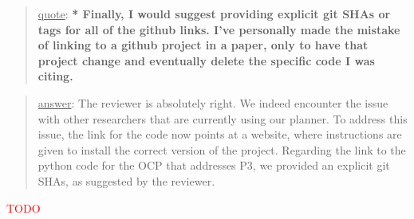 \documentclass[a4paper]{article}
\newcommand{\ndone}[0]{\textcolor{red}{TODO}}
\newcommand\quot[1]{\begin{quote} \underline{quote}: \textbf{#1}\end{quote}}
\newcommand\as[1]{\begin{quote} \underline{answer}: {#1}\end{quote} }
\begin{document}
\quot{* Finally, I would suggest providing explicit git SHAs or tags for all
of the github links. I've personally made the mistake of linking to a
github project in a paper, only to have that project change and
eventually delete the specific code I was citing. }
\as{The reviewer is absolutely right. We indeed encounter the issue with other researchers that are currently using our planner. 
To address this issue, the link for the code now points at a website, where instructions are given to install the correct version of the project.
Regarding the link to the python code for the OCP that addresses P3, we provided an explicit git SHAs, as suggested by the reviewer.}\ndone
\end{document}
